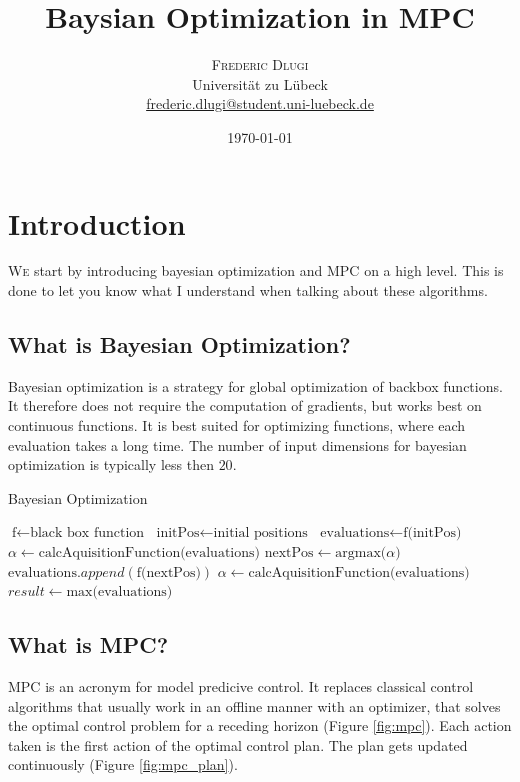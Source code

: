 \documentclass[twoside,twocolumn]{article}
\title{Baysian Optimization in MPC} %
\author{%
\textsc{Frederic Dlugi}\\[1ex] %
\normalsize Universität zu Lübeck \\ %
\normalsize \href{mailto:frederic.dlugi@student.uni-luebeck.de}{frederic.dlugi@student.uni-luebeck.de} %
}
\date{\today} %
\begin{document}
\maketitle


\section{Introduction}

\lettrine[nindent=0em,lines=3]{W} e start by introducing bayesian optimization and MPC on a high level.
This is done to let you know what I understand when talking about these algorithms.

\subsection{What is Bayesian Optimization?}
Bayesian optimization is a strategy for global optimization of backbox functions.
It therefore does not require the computation of gradients, but works best on continuous functions.
It is best suited for optimizing functions, where each evaluation takes a long time.
The number of input dimensions for bayesian optimization is typically less then $20$.\cite{frazier2018tutorial}

\begin{algorithm}
    \caption{Bayesian Optimization}
    \begin{algorithmic}
        \State $\text{f} \gets \text{black box function}$
        \State $\text{initPos} \gets \text{initial positions}$
        \State $\text{evaluations} \gets \text{f(initPos)}$
        \State $\alpha \gets \text{calcAquisitionFunction(evaluations)}$
            \State $\text{nextPos} \gets \text{argmax(}\alpha\text{)}$
            \State $\text{evaluations}.append(\text{f(nextPos)})$
            \State $\alpha \gets \text{calcAquisitionFunction(evaluations)}$
        \EndFor
        \State $result \gets \text{max(evaluations)}$
    \end{algorithmic}
\end{algorithm}

\subsection{What is MPC?}
MPC is an acronym for model predicive control.
It replaces classical control algorithms that usually work in an offline manner with an optimizer,
that solves the optimal control problem for a receding horizon (Figure \ref{fig:mpc}).
Each action taken is the first action of the optimal control plan.
The plan gets updated continuously (Figure \ref{fig:mpc_plan}).
\end{document}

